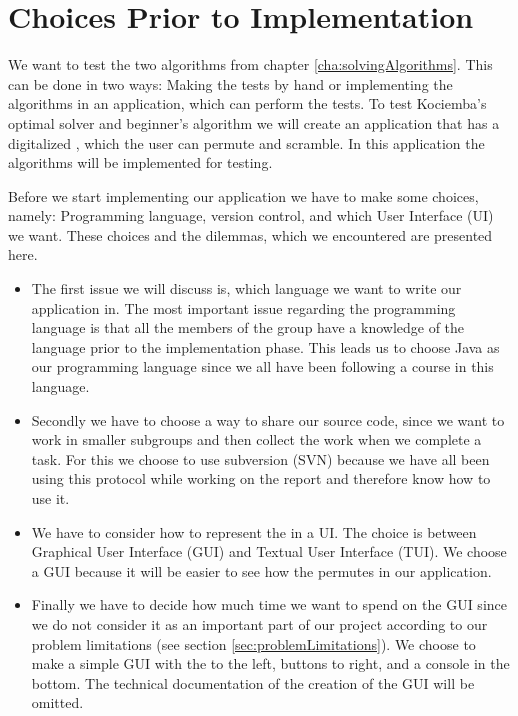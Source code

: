 \chapter{Choices Prior to Implementation}
\label{cha:choicesPriorToImplementation}
We want to test the two algorithms from chapter \ref{cha:solvingAlgorithms}.
This can be done in two ways: Making the tests by hand or implementing the algorithms in an application, which can perform the tests.
To test Kociemba's optimal solver and beginner's algorithm we will create an application that has a digitalized \rubik{}, which the user can permute and scramble.
In this application the algorithms will be implemented for testing.


Before we start implementing our application we have to make some choices, namely: Programming language, version control, and which User Interface (UI) we want.
These choices and the dilemmas, which we encountered are presented here.

\begin{itemize}
	\item The first issue we will discuss is, which language we want to write our application in.
The most important issue regarding the programming language is that all the members of the group have a knowledge of the language prior to the implementation phase.
This leads us to choose Java as our programming language since we all have been following a course in this language.

	\item Secondly we have to choose a way to share our source code, since we want to work in smaller subgroups and then collect the work when we complete a task.
For this we choose to use subversion (SVN) because we have all been using this protocol while working on the report and therefore know how to use it.

	\item We have to consider how to represent the \rubik{} in a UI. The choice is between Graphical User Interface (GUI) and Textual User Interface (TUI). We choose a GUI because it will be easier to see how the \rubik{} permutes in our application.
	  
	\item Finally we have to decide how much time we want to spend on the GUI since we do not consider it as an important part of our project according to our problem limitations (see section \ref{sec:problemLimitations}).
We choose to make a simple GUI with the \rubik{} to the left, buttons to right, and a console in the bottom.
The technical documentation of the creation of the GUI will be omitted.
\end{itemize}
